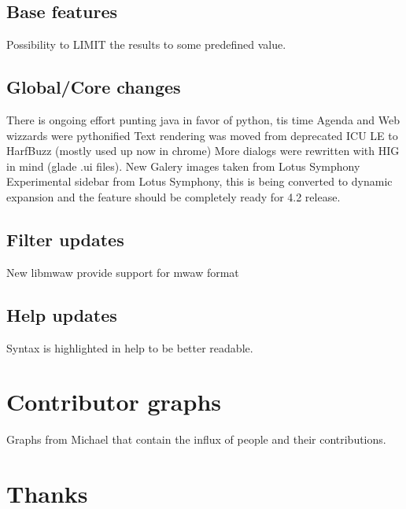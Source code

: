 \documentclass{beamer}
\begin{document}
\subsection{Base features}

\begin{frame}
Possibility to LIMIT the results to some predefined value.
\end{frame}

\subsection{Global/Core changes}

\begin{frame}
There is ongoing effort punting java in favor of python, tis time Agenda and Web wizzards were pythonified
Text rendering was moved from deprecated ICU LE to HarfBuzz (mostly used up now in chrome)
More dialogs were rewritten with HIG in mind (glade .ui files).
New Galery images taken from Lotus Symphony
Experimental sidebar from Lotus Symphony, this is being converted to dynamic expansion and the feature should be completely ready for 4.2 release.
\end{frame}

\subsection{Filter updates}

\begin{frame}
New libmwaw provide support for mwaw format
\end{frame}

\subsection{Help updates}

\begin{frame}
Syntax is highlighted in help to be better readable.
\end{frame}

\section{Contributor graphs}

\begin{frame}
Graphs from Michael that contain the influx of people and their contributions.
\end{frame}

\section{Thanks}
\end{document}

